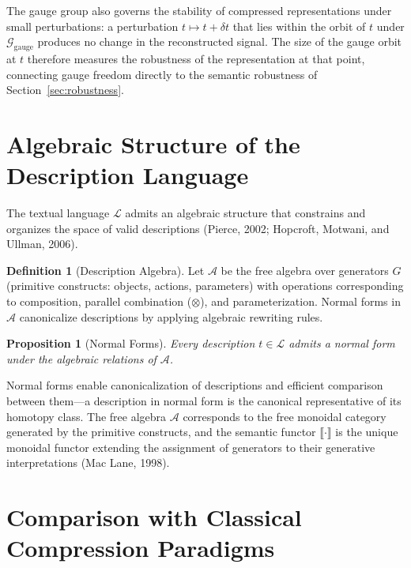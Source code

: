 \documentclass[11pt,a4paper]{article}
\newtheorem{proposition}[theorem]{Proposition}
\theoremstyle{definition}
\newtheorem{definition}[theorem]{Definition}
\theoremstyle{remark}
\begin{document}
The gauge group also governs the stability of compressed representations under small perturbations: a perturbation $t \mapsto t + \delta t$ that lies within the orbit of $t$ under $\mathcal{G}_{\mathrm{gauge}}$ produces no change in the reconstructed signal. The size of the gauge orbit at $t$ therefore measures the robustness of the representation at that point, connecting gauge freedom directly to the semantic robustness of Section~\ref{sec:robustness}.

\section{Algebraic Structure of the Description Language}
\label{sec:algebra}

The textual language $\mathcal{L}$ admits an algebraic structure that constrains and organizes the space of valid descriptions (Pierce, 2002; Hopcroft, Motwani, and Ullman, 2006).

\begin{definition}[Description Algebra]
Let $\mathcal{A}$ be the free algebra over generators $G$ (primitive constructs: objects, actions, parameters) with operations corresponding to composition, parallel combination ($\otimes$), and parameterization. Normal forms in $\mathcal{A}$ canonicalize descriptions by applying algebraic rewriting rules.
\end{definition}

\begin{proposition}[Normal Forms]
Every description $t \in \mathcal{L}$ admits a normal form under the algebraic relations of $\mathcal{A}$.
\end{proposition}

Normal forms enable canonicalization of descriptions and efficient comparison between them---a description in normal form is the canonical representative of its homotopy class. The free algebra $\mathcal{A}$ corresponds to the free monoidal category generated by the primitive constructs, and the semantic functor $\llbracket \cdot \rrbracket$ is the unique monoidal functor extending the assignment of generators to their generative interpretations (Mac Lane, 1998).

\section{Comparison with Classical Compression Paradigms}
\label{sec:comparison}
\end{document}
